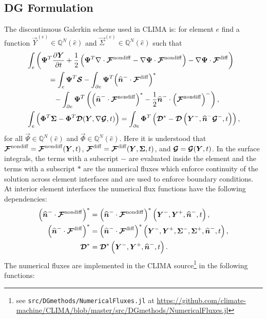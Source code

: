 \documentclass{report}
\begin{document}
{\subsection{DG Formulation}
The discontinuous Galerkin scheme used in CLIMA is: for element $e$ find a
function $\vec{Y}^{(e)} \in \mathbb{Q}^{N}(\hat{e})$
and $\vec{\Sigma}^{(e)} \in \mathbb{Q}^{N}(\hat{e})$
such that
\begin{align}
  &\int_{e}
  \left(
  \boldsymbol{{\Psi}}^T \frac{\partial \boldsymbol{{Y}}}{\partial t}
  + \frac{1}{2}
  \left(
  \boldsymbol{{\Psi}}^{T} \nabla \cdot \boldsymbol{{\mathcal{F}}}^{\mathrm{nondiff}}
  -
  \nabla\boldsymbol{{\Psi}} \cdot
  \boldsymbol{{\mathcal{F}}}^{\mathrm{nondiff}}
  \right)
  -
  \nabla\boldsymbol{{\Psi}} \cdot
  \boldsymbol{{\mathcal{F}}}^{\mathrm{diff}}
  \right)\\\notag
  &\quad\quad\quad =
  \int_{e} \boldsymbol{{\Psi}}^T \boldsymbol{{\mathcal{S}}}
  -
  \int_{\partial e}
  \boldsymbol{{\Psi}}^{T}
  {\left(\widehat{\boldsymbol{{n}}}^{-} \cdot \boldsymbol{{\mathcal{F}}}^{\mathrm{diff}}\right)}^{*}
  \\\notag
  &\quad\quad\quad\phantom{=}-
  \int_{\partial e}
  \boldsymbol{{\Psi}}^{T} \left(
  {\left(\widehat{\boldsymbol{{n}}}^{-} \cdot \boldsymbol{{\mathcal{F}}}^{\mathrm{nondiff}}\right)}^{*}
  - \frac{1}{2} \widehat{\boldsymbol{{n}}}^{-} \cdot {\left(\boldsymbol{{\mathcal{F}}}^{\mathrm{nondiff}}\right)}^{-}
  \right)
  ,\\
  &\int_{e}
  \left(
  \boldsymbol{{\Phi}}^T \boldsymbol{{\Sigma}}
  -
  \boldsymbol{{\Phi}}^T \boldsymbol{{\mathcal{D}}}(\boldsymbol{{Y}}, \nabla \boldsymbol{{\mathcal{G}}}, t)
  \right)
  =
  \int_{\partial e} \boldsymbol{{\Phi}}^{T} \left(
  \boldsymbol{{\mathcal{D}}}^{*} - \boldsymbol{{\mathcal{D}}}\left(\boldsymbol{{Y}}^{-},
  \widehat{\boldsymbol{{n}}}^{-}\boldsymbol{{\mathcal{G}}}^{-}, t\right)
  \right),
\end{align}
for all $\vec{\Psi} \in \mathbb{Q}^{N}(\hat{e})$ and $\vec{\Phi} \in
\mathbb{Q}^{N}(\hat{e})$.  Here it is understood that $\boldsymbol{{\mathcal{F}}}^{\mathrm{nondiff}} =
\boldsymbol{{\mathcal{F}}}^{\mathrm{nondiff}}(\boldsymbol{{Y}}, t)$, $\boldsymbol{{\mathcal{F}}}^{\mathrm{diff}} = \boldsymbol{{\mathcal{F}}}^{\mathrm{diff}}(\boldsymbol{{Y}}, \boldsymbol{{\Sigma}}, t)$, and
$\boldsymbol{{\mathcal{G}}} = \boldsymbol{{\mathcal{G}}}(\boldsymbol{{Y}}, t)$. In the surface integrals, the
terms with a subscript $-$ are evaluated inside the element and the terms with a
subscript $*$ are the numerical fluxes which enforce continuity of the solution
across element interfaces and are used to enforce boundary conditions. At
interior element interfaces the numerical flux functions have the following
dependencies:
\begin{align}
  {\left(\widehat{\boldsymbol{{n}}}^{-} \cdot \boldsymbol{{\mathcal{F}}}^{\mathrm{nondiff}}\right)}^{*}
  &=
  {\left(\widehat{\boldsymbol{{n}}}^{-} \cdot \boldsymbol{{\mathcal{F}}}^{\mathrm{nondiff}}\right)}^{*}
  \left(
  \boldsymbol{{Y}}^{-}, \boldsymbol{{Y}}^{+}, \widehat{\boldsymbol{{n}}}^{-}, t
  \right),\\
  {\left(\widehat{\boldsymbol{{n}}}^{-} \cdot \boldsymbol{{\mathcal{F}}}^{\mathrm{diff}}\right)}^{*}
  &=
  {\left(\widehat{\boldsymbol{{n}}}^{-} \cdot \boldsymbol{{\mathcal{F}}}^{\mathrm{diff}}\right)}^{*}
  \left(
  \boldsymbol{{Y}}^{-}, \boldsymbol{{Y}}^{+}, \boldsymbol{{\Sigma}}^{-}, \boldsymbol{{\Sigma}}^{+}, \widehat{\boldsymbol{{n}}}^{-}, t
  \right),\\
  \boldsymbol{{\mathcal{D}}}^{*} &=
  \boldsymbol{{\mathcal{D}}}^{*}\left(
  \boldsymbol{{Y}}^{-}, \boldsymbol{{Y}}^{+}, \widehat{\boldsymbol{{n}}}^{-}, t
  \right).
\end{align}
The numerical fluxes are implemented in the CLIMA
source\footnote{see
\texttt{src/DGmethods/NumericalFluxes.jl} at
\url{https://github.com/climate-machine/CLIMA/blob/master/src/DGmethods/NumericalFluxes.jl}}
in the following functions:

}
\end{document}

